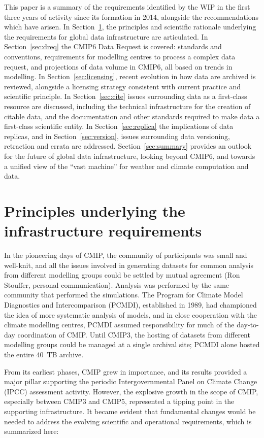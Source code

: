 \documentclass[gmd,manuscript]{copernicus}
\newcommand{\secref}[1] {\mbox{Section  \ref{sec:#1}}}
\begin{document}
This paper is a summary of the requirements identified by the WIP in
the first three years of activity since its formation in 2014,
alongside the recommendations which have arisen. In
\secref{principles}, the principles and scientific rationale
underlying the requirements for global data infrastructure are
articulated. In \secref{dreq} the CMIP6 Data Request is covered:
standards and conventions, requirements for modelling centres to
process a complex data request, and projections of data volume in
CMIP6, all based on trends in modelling. In \secref{licensing}, recent
evolution in how data are archived is reviewed, alongside a licensing
strategy consistent with current practice and scientific principle. In
\secref{cite} issues surrounding data as a first-class resource are
discussed, including the technical infrastructure for the creation of
citable data, and the documentation and other standards required to
make data a first-class scientific entity. In \secref{replica} the
implications of data replicas, and in \secref{version}, issues
surrounding data versioning, retraction and errata are addressed.
\secref{summary} provides an outlook for the future of global data
infrastructure, looking beyond CMIP6, and towards a unified view of
the ``vast machine'' for weather and climate computation and data.

\section{Principles underlying the infrastructure requirements}
\label{sec:principles}

In the pioneering days of CMIP, the community of participants was
small and well-knit, and all the issues involved in generating
datasets for common analysis from different modelling groups could be
settled by mutual agreement (Ron Stouffer, personal communication).
Analysis was performed by the same community that performed the
simulations. The Program for Climate Model Diagnostics and
Intercomparison (PCMDI), established in 1989, had championed the idea
of more systematic analysis of models, and in close cooperation with
the climate modelling centres, PCMDI assumed responsibility for
much of the day-to-day coordination of CMIP. Until CMIP3, the hosting
of datasets from different modelling groups could be managed at a
single archival site; PCMDI alone hosted the entire 40~TB archive.

From its earliest phases, CMIP grew in importance, and its results
provided a major pillar supporting the periodic Intergovernmental
Panel on Climate Change (IPCC) assessment activity. However, the
explosive growth in the scope of CMIP, especially between CMIP3 and
CMIP5, represented a tipping point in the supporting infrastructure. 
It became evident that fundamental changes would be needed to address 
the evolving scientific and operational requirements, which is summarized
here:
\end{document}
